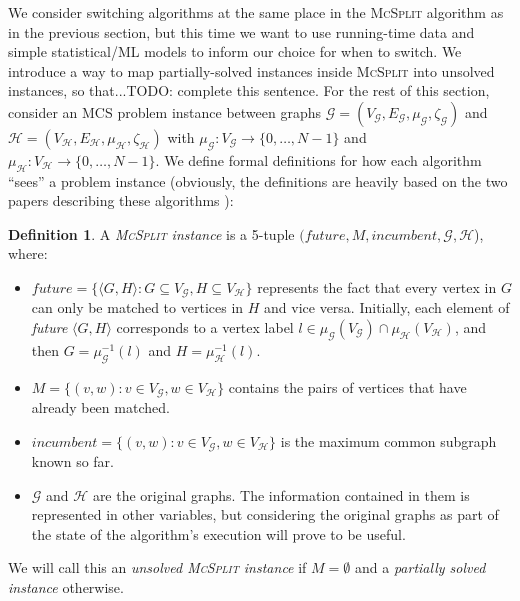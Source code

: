 \documentclass{l4proj}
\theoremstyle{definition}
\newtheorem{definition}{Definition}[chapter]
\theoremstyle{remark}
\begin{document}
We consider switching algorithms at the same place in the \textsc{McSplit}
algorithm as in the previous section, but this time we want to use running-time
data and simple statistical/ML models to inform our choice for when to switch.
We introduce a way to map partially-solved instances inside \textsc{McSplit}
into unsolved instances, so that...TODO: complete this sentence. For the rest of
this section, consider an MCS problem instance between graphs $\mathcal{G} =
(V_{\mathcal{G}}, E_{\mathcal{G}}, \mu_{\mathcal{G}}, \zeta_{\mathcal{G}})$ and
$\mathcal{H} = (V_{\mathcal{H}}, E_{\mathcal{H}}, \mu_{\mathcal{H}},
\zeta_{\mathcal{H}})$ with $\mu_{\mathcal{G}} \colon V_{\mathcal{G}} \to \{ 0,
\dots, N - 1 \}$ and $\mu_{\mathcal{H}} \colon V_{\mathcal{H}} \to \{ 0, \dots,
N - 1\}$. We define formal definitions for how each algorithm ``sees'' a
problem instance (obviously, the definitions are heavily based on the two papers
describing these algorithms \cite{DBLP:conf/cp/McCreeshNPS16,
  DBLP:conf/ijcai/McCreeshPT17}):

\begin{definition} \label{def:mcsplit_instance}
  A \emph{\textsc{McSplit} instance} is a 5-tuple
  $(\textit{future}, M, \textit{incumbent}, \mathcal{G}, \mathcal{H}$), where:
  \begin{itemize}
  \item $\textit{future} = \{ \langle G, H \rangle : G \subseteq
    V_{\mathcal{G}}, H \subseteq V_{\mathcal{H}} \}$ represents the fact that
    every vertex in $G$ can only be matched to vertices in $H$ and vice versa.
    Initially, each element of \textit{future} $\langle G, H \rangle $
    corresponds to a vertex label $l \in \mu_{\mathcal{G}}(V_{\mathcal{G}}) \cap
    \mu_{\mathcal{H}}(V_{\mathcal{H}})$, and then $G =
    \mu_{\mathcal{G}}^{-1}(l)$ and $H = \mu_{\mathcal{H}}^{-1}(l)$.
  \item $M = \{ (v, w) : v \in V_{\mathcal{G}}, w \in V_{\mathcal{H}} \}$
    contains the pairs of vertices that have already been matched.
  \item $\textit{incumbent} = \{ (v, w) : v \in V_{\mathcal{G}}, w \in
    V_{\mathcal{H}} \}$ is the maximum common subgraph known so far.
  \item $\mathcal{G}$ and $\mathcal{H}$ are the original graphs. The information
    contained in them is represented in other variables, but considering the
    original graphs as part of the state of the algorithm's execution will prove
    to be useful.
  \end{itemize}
  We will call this an \emph{unsolved \textsc{McSplit} instance} if $M =
  \emptyset$ and a \emph{partially solved instance} otherwise.
\end{definition}
\end{document}
